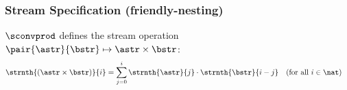 \documentclass[10pt]{beamer}
\begin{document}
\begin{frame}%
  \frametitle{Stream Specification (friendly-nesting)}
  
\newcommand{\myvspace}{\rule{0pt}{2.2ex}}  
\renewcommand{\arraystretch}{1.25}
  
\begin{example}
  \vspace*{-0.5ex}
\begin{center}  
  \vspace*{-1.5ex}
\end{center}
\end{example}

$\sconvprod$ defines %
the stream operation
$ \pair{\astr}{\bstr} \mapsto \astr\times\bstr $:
%
\begin{align*}
  \strnth{({\astr}\times{\bstr})}{i} 
    & = \sum_{j=0}^i \strnth{\astr}{j}\cdot\strnth{\bstr}{i-j} 
  & & \text{(for all $i\in\nat$)}
\end{align*}

\end{frame}%
\end{document}

